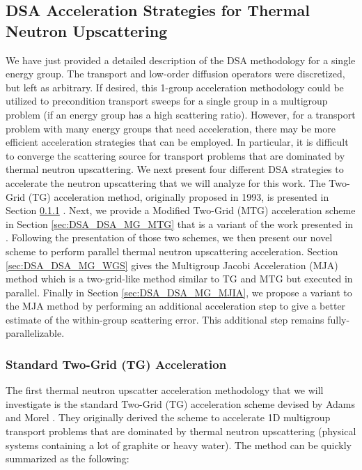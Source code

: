 \subsection{DSA Acceleration Strategies for Thermal Neutron Upscattering}
\label{sec::DSA_DSA_MG}

We have just provided a detailed description of the DSA methodology for a single energy group. The transport and low-order diffusion operators were discretized, but left as arbitrary. If desired, this 1-group acceleration methodology could be utilized to precondition transport sweeps for a single group in a multigroup problem (if an energy group has a high scattering ratio). However, for a transport problem with many energy groups that need acceleration, there may be more efficient acceleration strategies that can be employed. In particular, it is difficult to converge the scattering source for transport problems that are dominated by thermal neutron upscattering. We next present four different DSA strategies to accelerate the neutron upscattering that we will analyze for this work. The Two-Grid (TG) acceleration method, originally proposed in 1993, is presented in Section \ref{sec:DSA_DSA_MG_TG} \cite{adams1993two}. Next, we provide a Modified Two-Grid (MTG) acceleration scheme in Section \ref{sec:DSA_DSA_MG_MTG} that is a variant of the work presented in \cite{evans2010transport}. Following the presentation of those two schemes, we then present our novel scheme to perform parallel thermal neutron upscattering acceleration. Section \ref{sec:DSA_DSA_MG_WGS} gives the Multigroup Jacobi Acceleration (MJA) method which is a two-grid-like method similar to TG and MTG but executed in parallel. Finally in Section \ref{sec:DSA_DSA_MG_MJIA}, we propose a variant to the MJA method by performing an additional acceleration step to give a better estimate of the within-group scattering error. This additional step remains fully-parallelizable.

\subsubsection{Standard Two-Grid (TG) Acceleration}
\label{sec:DSA_DSA_MG_TG}

The first thermal neutron upscatter acceleration methodology that we will investigate is the standard Two-Grid (TG) acceleration scheme devised by Adams and Morel \cite{adams1993two}. They originally derived the scheme to accelerate 1D multigroup transport problems that are dominated by thermal neutron upscattering (physical systems containing a lot of graphite or heavy water). The method can be quickly summarized as the following:

